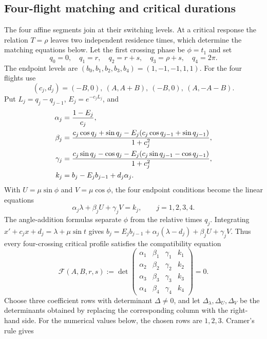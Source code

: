 \documentclass[11pt,a4paper]{article}
\begin{document}
\subsection{Four-flight matching and critical durations}
The four affine segments join at their switching levels. At a critical
response the relation $T=\rho$ leaves two independent residence times,
which determine the matching equations below.
Let the first crossing phase be $\phi=t_1$ and set
\[
 q_0=0,\quad q_1=r,\quad q_2=r+s,\quad
 q_3=\rho+s,\quad q_4=2\pi.
\]
The endpoint levels are
$(b_0,b_1,b_2,b_3,b_4)=(1,-1,-1,1,1)$.
For the four flights use
\[
 (c_j,d_j)=(-B,0),\ (A,A+B),\ (-B,0),\ (A,-A-B).
\]
Put $L_j=q_j-q_{j-1}$, $E_j=e^{-c_jL_j}$, and
\begin{align}
 \alpha_j&=\frac{1-E_j}{c_j},\notag\\
 \beta_j&=\frac{c_j\cos q_j+\sin q_j
       -E_j(c_j\cos q_{j-1}+\sin q_{j-1})}{1+c_j^2},\notag\\
 \gamma_j&=\frac{c_j\sin q_j-\cos q_j
       -E_j(c_j\sin q_{j-1}-\cos q_{j-1})}{1+c_j^2},\label{eq:matching-coefficients}\\
 k_j&=b_j-E_jb_{j-1}+d_j\alpha_j.\notag
\end{align}
With $U=\mu\sin\phi$ and $V=\mu\cos\phi$, the four endpoint
conditions become the linear equations
\begin{equation}\label{eq:linear-matching}
 \alpha_j\lambda+\beta_jU+\gamma_jV=k_j,
 \qquad j=1,2,3,4.
\end{equation}
The angle-addition formulas separate $\phi$ from the relative times $q_j$.
Integrating $x'+c_jx+d_j=\lambda+\mu\sin t$ gives
$b_j=E_jb_{j-1}+\alpha_j(\lambda-d_j)+\beta_jU+\gamma_jV$.
Thus every four-crossing critical profile satisfies the compatibility equation
\begin{equation}\label{eq:compatibility}
 \mathcal F(A,B,r,s):=
 \det\begin{pmatrix}
 \alpha_1&\beta_1&\gamma_1&k_1\\
 \alpha_2&\beta_2&\gamma_2&k_2\\
 \alpha_3&\beta_3&\gamma_3&k_3\\
 \alpha_4&\beta_4&\gamma_4&k_4
 \end{pmatrix}=0.
\end{equation}
Choose three coefficient rows with determinant $\Delta\ne0$, and let
$\Delta_\lambda,\Delta_U,\Delta_V$ be the determinants obtained by
replacing the corresponding column with the right-hand side.
For the numerical values below, the chosen rows are $1,2,3$.
Cramer's rule gives
\end{document}
